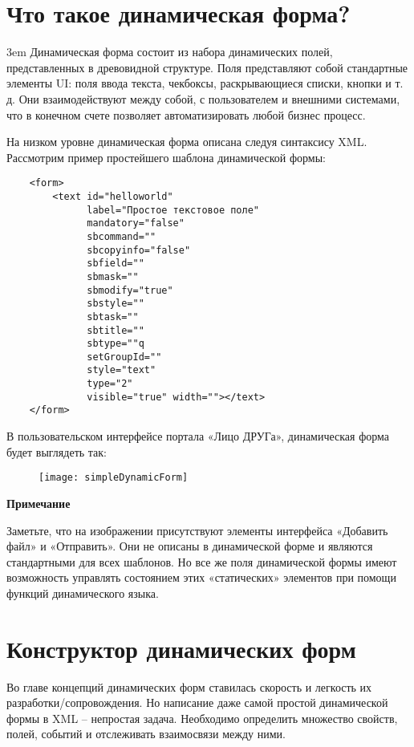 \documentclass[../index.tex]{subfiles}
\begin{document}
\section{Что такое динамическая форма?}
\emergencystretch 3em
Динамическая форма состоит из набора динамических полей, представленных в древовидной структуре.
Поля представляют собой стандартные элементы UI: поля ввода текста, чекбоксы, раскрывающиеся списки, кнопки и т. д.
Они взаимодействуют между собой, с пользователем и внешними системами,
что в конечном счете позволяет автоматизировать любой бизнес процесс.

На низком уровне динамическая форма описана следуя синтаксису XML.
Рассмотрим пример простейшего шаблона динамической формы:
\begin{verbatim}
    <form>
        <text id="helloworld"
              label="Простое текстовое поле"
              mandatory="false"
              sbcommand=""
              sbcopyinfo="false"
              sbfield=""
              sbmask=""
              sbmodify="true"
              sbstyle=""
              sbtask=""
              sbtitle=""
              sbtype=""q
              setGroupId=""
              style="text"
              type="2"
              visible="true" width=""></text>
    </form>
\end{verbatim}

В пользовательском интерфейсе портала «Лицо ДРУГа», динамическая форма будет выглядеть так:

\begin{figure}[h]
	\texttt{[image: simpleDynamicForm]}
	\centering
\end{figure}

\textbf{Примечание}

Заметьте, что на изображении присутствуют элементы интерфейса «Добавить файл» и «Отправить».
Они не описаны в динамической форме и являются стандартными для всех шаблонов.
Но все же поля динамической формы имеют возможность управлять состоянием этих «статических» элементов
при помощи функций динамического языка.

\section{Конструктор динамических форм}
Во главе концепций динамических форм ставилась скорость и легкость их разработки/сопровождения.
Но написание даже самой простой динамической формы в XML – непростая задача.
Необходимо определить множество свойств, полей, событий и отслеживать взаимосвязи между ними.
\end{document}
